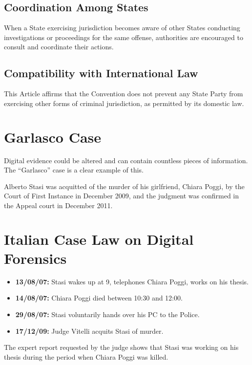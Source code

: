 \subsection{Coordination Among States}
When a State exercising jurisdiction becomes aware of other States conducting investigations or proceedings for the same offense, authorities are encouraged to consult and coordinate their actions.

\subsection{Compatibility with International Law}
This Article affirms that the Convention does not prevent any State Party from exercising other forms of criminal jurisdiction, as permitted by its domestic law.



\section{Garlasco Case}
Digital evidence could be altered and can contain countless pieces of information. The “Garlasco” case is a clear example of this. \bigskip

Alberto Stasi was acquitted of the murder of his girlfriend, Chiara Poggi, by the Court of First Instance in December 2009, and the judgment was confirmed in the Appeal court in December 2011.

\section{Italian Case Law on Digital Forensics}
\begin{itemize}
    \item \textbf{13/08/07:} Stasi wakes up at 9, telephones Chiara Poggi, works on his thesis.
    \item \textbf{14/08/07:} Chiara Poggi died between 10:30 and 12:00.
    \item \textbf{29/08/07:} Stasi voluntarily hands over his PC to the Police.
    \item \textbf{17/12/09:} Judge Vitelli acquits Stasi of murder.
\end{itemize}
The expert report requested by the judge shows that Stasi was working on his thesis during the period when Chiara Poggi was killed.

